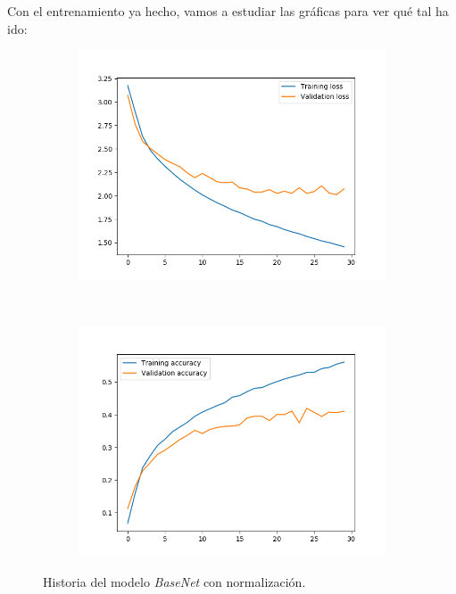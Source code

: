 \documentclass[11pt,a4paper]{article}
\begin{document}
Con el entrenamiento ya hecho, vamos a estudiar las gráficas para ver qué tal ha ido:

\begin{figure}[H]
  \centering
  \begin{subfigure}{.5\textwidth}
    \includegraphics[scale=0.4]{img/norm-loss.png}
    \label{fig:norm-loss}
  \end{subfigure}%
  ~ \quad
  \begin{subfigure}{.5\textwidth}
  	\includegraphics[scale=0.4]{img/norm-acc.png}
  	\label{fig:norm-acc}
  \end{subfigure}
  \caption{Historia del modelo \textit{BaseNet} con normalización.}
  \label{fig:norm-history}
\end{figure}
\end{document}
